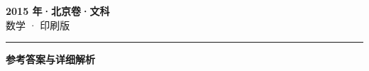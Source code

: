\documentclass[zihao=5, a4paper]{ctexart}
\begin{document}
\begin{center}
  {\Large\bfseries 2015 年·北京卷·文科}\\[4pt]
  {\large 数学 · 印刷版}
\end{center}
\medskip
{}

\par\bigskip\hrule\bigskip
{}
\begin{center}{\large\bfseries 参考答案与详细解析}\end{center}
\smallskip

\end{document}
